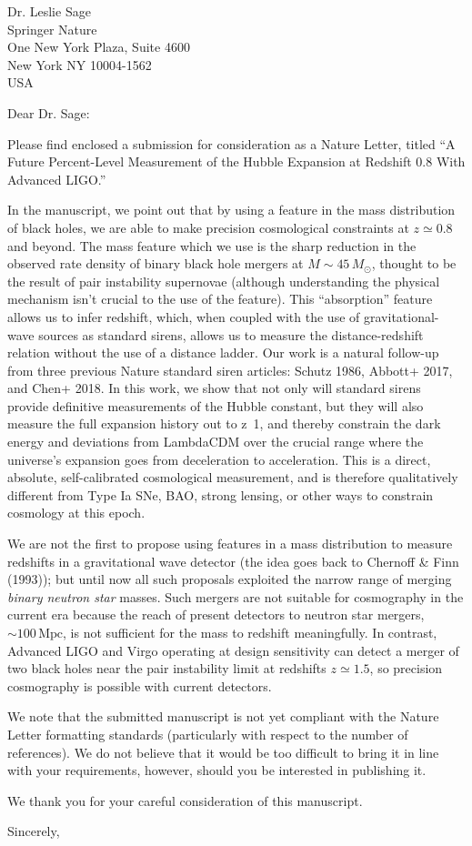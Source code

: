\documentclass{letter}
\begin{document}
\begin{letter}{Dr. Leslie Sage\\Springer Nature\\One New York Plaza, Suite 4600\\New York NY 10004-1562\\USA}

\opening{Dear Dr. Sage:}

Please find enclosed a submission for consideration as a Nature Letter, titled
``A Future Percent-Level Measurement of the Hubble Expansion at Redshift 0.8
With Advanced LIGO.''

In the manuscript, we point out that by using a feature in the mass distribution
of black holes, we are able to make precision cosmological constraints at $z
\simeq 0.8$ and beyond. The mass feature which we use is the sharp reduction in
the observed rate density of binary black hole mergers at $M \sim 45\, M_\odot$,
thought to be the result of pair instability supernovae (although understanding
the physical mechanism isn't crucial to the use of the feature). This
``absorption'' feature allows us to infer redshift, which, when coupled with the
use of gravitational-wave sources as standard sirens, allows us to measure the
distance-redshift relation without the use of a distance ladder. Our work is a
natural follow-up from three previous Nature standard siren articles: Schutz
1986, Abbott+ 2017, and Chen+ 2018. In this work, we show that not only will
standard sirens provide definitive measurements of the Hubble constant, but they
will also measure the full expansion history out to z~1, and thereby constrain
the dark energy and deviations from LambdaCDM over the crucial range where the
universe's expansion goes from deceleration to acceleration. This is a direct,
absolute, self-calibrated cosmological measurement, and is therefore
qualitatively different from Type Ia SNe, BAO, strong lensing, or other ways to
constrain cosmology at this epoch.

We are not the first to propose using features in a mass distribution to measure
redshifts in a gravitational wave detector (the idea goes back to Chernoff \&
Finn (1993)); but until now all such proposals exploited the narrow range of
merging \emph{binary neutron star} masses.  Such mergers are not suitable for
cosmography in the current era because the reach of present detectors to neutron
star mergers, $\sim 100 \, \mathrm{Mpc}$, is not sufficient for the mass to
redshift meaningfully.  In contrast, Advanced LIGO and Virgo operating at design
sensitivity can detect a merger of two black holes near the pair instability
limit at redshifts $z \simeq 1.5$, so precision cosmography is possible with
current detectors.

We note that the submitted manuscript is not yet compliant with the Nature
Letter formatting standards (particularly with respect to the number of
references).  We do not believe that it would be too difficult to bring it in
line with your requirements, however, should you be interested in publishing it.

We thank you for your careful consideration of this manuscript.

\closing{Sincerely,}

\end{letter}
\end{document}
